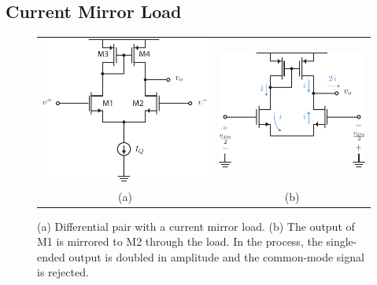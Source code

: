 \subsection{Current Mirror Load} \label{sec:cur_mir_load}
\begin{figure}[tb]
\begin{center}
\begin{tabular}{cc}
\includegraphics[scale=1]{Diffpair_se_output.pdf} &
\includegraphics[scale=1]{Diffpair_se_ac.pdf}\\
(a) & (b) \\
\end{tabular}
\end{center}
\caption{(a) Differential pair with a current mirror load.  (b) The output of M1 is mirrored to M2 through the load. In the process, the single-ended output is doubled in amplitude and the common-mode signal is rejected.}
\label{fig:Diffpair_se_output.pdf}
\end{figure}

